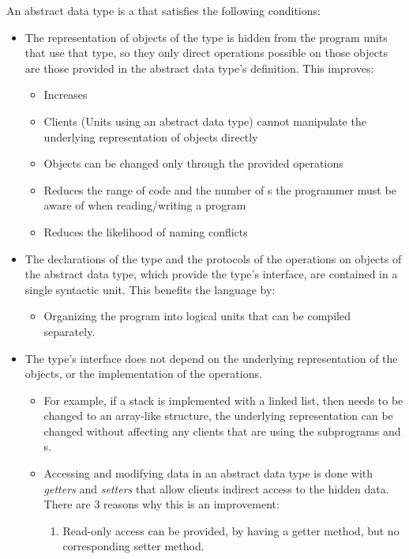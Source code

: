 \begin{definition}
  An abstract data type is a  that satisfies the following conditions:
  \begin{itemize}[noitemsep]
  \item The representation of objects of the type is hidden from the program units that use that type, so they only direct operations possible on those objects are those provided in the abstract data type's definition. This improves:
    \begin{itemize}[noitemsep]
    \item Increases 
    \item Clients (Units using an abstract data type) cannot manipulate the underlying representation of objects directly
    \item Objects can be changed only through the provided operations
    \item Reduces the range of code and the number of s the programmer must be aware of when reading/writing a program
    \item Reduces the likelihood of naming conflicts
    \end{itemize}
  \item The declarations of the type and the protocols of the operations on objects of the abstract data type, which provide the type's interface, are contained in a single syntactic unit. This benefits the language by:
    \begin{itemize}[noitemsep]
    \item Organizing the program into logical units that can be compiled separately.
    \end{itemize}
  \item The type's interface does not depend on the underlying representation of the objects, or the implementation of the operations.
    \begin{itemize}[noitemsep]
    \item For example, if a stack is implemented with a linked list, then needs to be changed to an array-like structure, the underlying representation can be changed without affecting any clients that are using the subprograms and s.
    \item Accessing and modifying data in an abstract data type is done with \emph{getters} and \emph{setters} that allow clients indirect access to the hidden data. There are 3 reasons why this is an improvement:
      \begin{enumerate}[noitemsep]
      \item Read-only access can be provided, by having a getter method, but no corresponding setter method.

\end{enumerate}
\end{itemize}
\end{itemize}
\end{definition}
